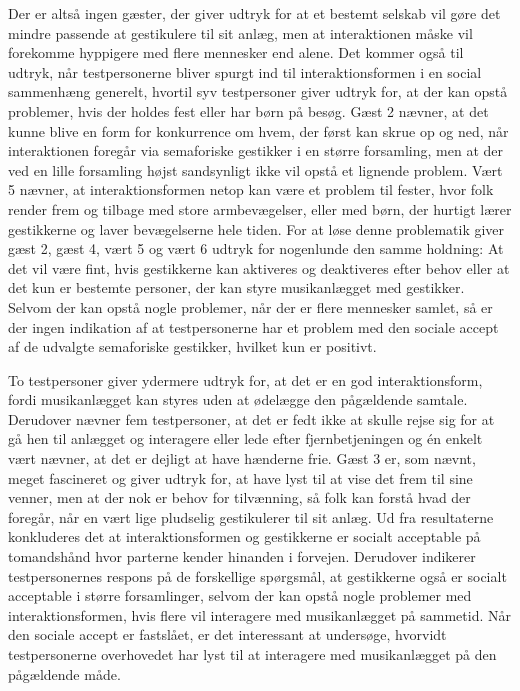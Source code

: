 Der er altså ingen gæster, der giver udtryk for at et bestemt selskab vil gøre det mindre passende at gestikulere til sit anlæg, men at interaktionen måske vil forekomme hyppigere med flere mennesker end alene. Det kommer også til udtryk, når testpersonerne bliver spurgt ind til interaktionsformen i en social sammenhæng generelt, hvortil syv testpersoner giver udtryk for, at der kan opstå problemer, hvis der holdes fest eller har børn på besøg. Gæst 2 nævner, at det kunne blive en form for konkurrence om hvem, der først kan skrue op og ned, når interaktionen foregår via semaforiske gestikker i en større forsamling, men at der ved en lille forsamling højst sandsynligt ikke vil opstå et lignende problem. Vært 5 nævner, at interaktionsformen netop kan være et problem til fester, hvor folk render frem og tilbage med store armbevægelser, eller med børn, der hurtigt lærer gestikkerne og laver bevægelserne hele tiden. For at løse denne problematik giver gæst 2, gæst 4, vært 5 og vært 6 udtryk for nogenlunde den samme holdning: At det vil være fint, hvis gestikkerne kan aktiveres og deaktiveres efter behov eller at det kun er bestemte personer, der kan styre musikanlægget med gestikker. Selvom der kan opstå nogle problemer, når der er flere mennesker samlet, så er der ingen indikation af at testpersonerne har et problem med den sociale accept af de udvalgte semaforiske gestikker, hvilket kun er positivt. 

To testpersoner giver ydermere udtryk for, at det er en god interaktionsform, fordi musikanlægget kan styres uden at ødelægge den pågældende samtale. Derudover nævner fem testpersoner, at det er fedt ikke at skulle rejse sig for at gå hen til anlægget og interagere eller lede efter fjernbetjeningen og én enkelt vært nævner, at det er dejligt at have hænderne frie. Gæst 3 er, som nævnt, meget fascineret og giver udtryk for, at have lyst til at vise det frem til sine venner, men at der nok er behov for tilvænning, så folk kan forstå hvad der foregår, når en vært lige pludselig gestikulerer til sit anlæg. \blankline
%
Ud fra resultaterne konkluderes det at interaktionsformen og gestikkerne er socialt acceptable på tomandshånd hvor parterne kender hinanden i forvejen. Derudover indikerer testpersonernes respons på de forskellige spørgsmål, at gestikkerne også er socialt acceptable i større forsamlinger, selvom der kan opstå nogle problemer med interaktionsformen, hvis flere vil interagere med musikanlægget på sammetid. Når den sociale accept er fastslået, er det interessant at undersøge, hvorvidt testpersonerne overhovedet har lyst til at interagere med musikanlægget på den pågældende måde. 

